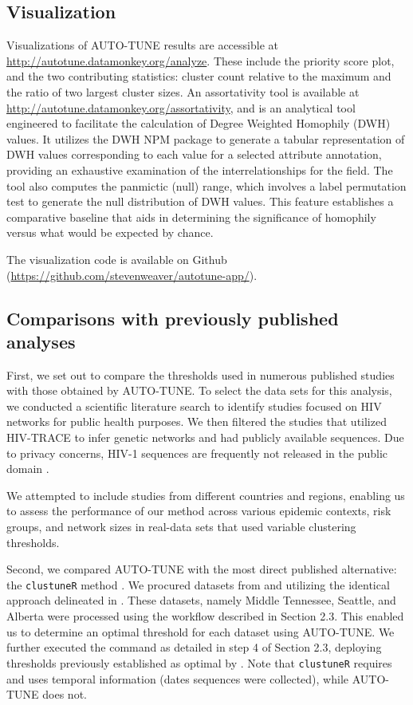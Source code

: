 \documentclass[utf8]{FrontiersinHarvard} %
\begin{document}
\subsection{Visualization}

Visualizations of AUTO-TUNE results are accessible at
\url{http://autotune.datamonkey.org/analyze}. These include the priority
score plot, and the two contributing statistics: cluster count relative to the maximum and 
the ratio of two largest cluster sizes.
\label{fig:webapp} An assortativity tool is available at
\url{http://autotune.datamonkey.org/assortativity}, and is an 
analytical tool engineered to facilitate the calculation of Degree Weighted
Homophily (DWH) values. It utilizes the DWH NPM package to generate a tabular
representation of DWH values corresponding to each value for a selected
attribute annotation, providing an exhaustive examination of the
interrelationships for the field. The tool also computes the
panmictic (null) range, which involves a label permutation test to generate the null
distribution of DWH values. This feature establishes a comparative baseline
that aids in determining the significance of homophily versus what would be
expected by chance. 

The visualization code is available on Github
(\url{https://github.com/stevenweaver/autotune-app/}).

\subsection{Comparisons with previously published analyses}

First, we set out to compare the thresholds used in numerous published
studies with those obtained by AUTO-TUNE. To select the data sets for
this analysis, we conducted a scientific literature search to identify studies
focused on HIV networks for public health purposes. We then filtered the
studies that utilized HIV-TRACE to infer genetic networks and had publicly
available sequences. Due to privacy concerns, HIV-1 sequences are frequently not released in the public domain
\cite{Inzaule:2023aa}.

We attempted to include studies from different
countries and regions, enabling us to assess the performance of our method
across various epidemic contexts, risk groups, and network sizes in real-data
sets that used variable clustering thresholds.

Second, we compared AUTO-TUNE with the most direct published alternative: the {\tt clustuneR} method
\citep{chato_public_2020}. We procured datasets from \citep{wolf_short_2017}
and \citep{vrancken_multi-faceted_2017} utilizing the identical approach
delineated in \cite{chato_public_2020}. These datasets, namely Middle
Tennessee, Seattle, and Alberta were processed using the workflow described
in Section 2.3. This enabled us to determine an optimal threshold for each
dataset using AUTO-TUNE. We further executed the command as detailed in step 4
of Section 2.3, deploying thresholds previously established as optimal by
\citep{chato_public_2020}. Note that  {\tt clustuneR} requires and uses temporal information (dates sequences were collected), while AUTO-TUNE does not.
\end{document}
